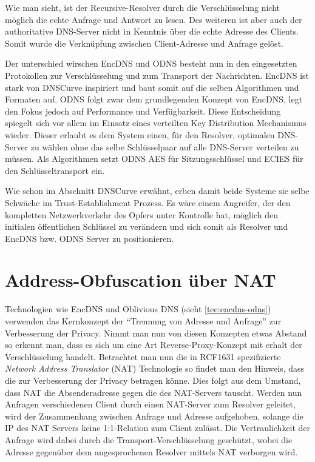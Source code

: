 Wie man sieht, ist der Recursive-Resolver durch die Verschlüsselung nicht möglich die echte Anfrage und Antwort zu lesen. Des weiteren ist aber auch der authoritative DNS-Server nicht in Kenntnis über die echte Adresse des Clients. Somit wurde die Verknüpfung zwischen Client-Adresse und Anfrage gelöst.

Der unterschied wirschen EncDNS und ODNS besteht nun in den eingesetzten Protokollen zur Verschlüsselung und zum Transport der Nachrichten. EncDNS ist stark von DNSCurve inspiriert und baut somit auf die selben Algorithmen und Formaten auf. ODNS folgt zwar dem grundlegenden Konzept von EncDNS, legt den Fokus jedoch auf Performance und Verfügbarkeit. Diese Entscheidung spiegelt sich vor allem im Einsatz eines verteilten Key Distribution Mechanismus wieder. Dieser erlaubt es dem System einen, für den Resolver, optimalen DNS-Server zu wählen ohne das selbe Schlüsselpaar auf alle DNS-Server verteilen zu müssen. Als Algorithmen setzt ODNS AES für Sitzungsschlüssel und ECIES für den Schlüsseltransport ein.

Wie schon im Abschnitt DNSCurve erwähnt, erben damit beide Systeme sie selbe Schwäche im Trust-Establishment Prozess. Es wäre einem Angreifer, der den kompletten Netzwerkverkehr des Opfers unter Kontrolle hat, möglich den initialen öffentlichen Schlüssel zu verändern und sich somit als Resolver und EncDNS bzw. ODNS Server zu positionieren.

\section{Address-Obfuscation über NAT}
\label{sec:tec-nat}
Technologien wie EncDNS und Oblivious DNS (sieht \ref{tec:encdns-odns}) verwenden das Kernkonzept der ``Trennung von Adresse und Anfrage'' zur Verbesserung der Privacy. Nimmt man nun von diesen Konzepten etwas Abstand so erkennt man, dass es sich um eine Art Reverse-Proxy-Konzept mit erhalt der Verschlüsselung handelt. Betrachtet man nun die in RCF1631\cite{rfc1631} spezifizierte \textit{Network Address Translator} (NAT) Technologie so findet man den Hinweis, dass die zur Verbesserung der Privacy betragen könne. Dies folgt aus dem Umstand, dass NAT die Absenderadresse gegen die des NAT-Servers tauscht. Werden nun Anfragen verschiedenen Client durch einen NAT-Server zum Resolver geleitet,  wird der Zusammenhang zwischen Anfrage und Adresse aufgehoben, solange die IP des NAT Servers keine 1:1-Relation zum Client zulässt. Die Vertraulichkeit der Anfrage wird dabei durch die Transport-Verschlüsselung geschützt, wobei die Adresse gegenüber dem angesprochenen Resolver mittels NAT verborgen wird.

